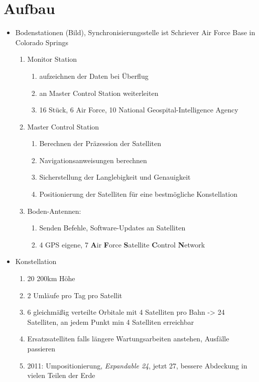 \section{Aufbau}
\label{sec:aufbau}

\begin{itemize}
    \item Bodenstationen (Bild), Synchronisierungsstelle ist Schriever Air Force Base in Colorado Springs
    \begin{enumerate}
        \item Monitor Station
        \begin{enumerate}
            \item aufzeichnen der Daten bei Überflug
            \item an Master Control Station weiterleiten
            \item 16 Stück, 6 Air Force, 10 National Geospital-Intelligence Agency
        \end{enumerate}
        \item Master Control Station
        \begin{enumerate}
            \item Berechnen der Präzession der Satelliten
            \item Navigationsanweisungen berechnen
            \item Sicherstellung der Langlebigkeit und Genauigkeit
            \item Positionierung der Satelliten für eine bestmögliche Konstellation
        \end{enumerate}
        \item Boden-Antennen:
        \begin{enumerate}
            \item Senden Befehle, Software-Updates an Satelliten
            \item 4 GPS eigene, 7 \textbf{A}ir \textbf{F}orce \textbf{S}atellite \textbf{C}ontrol \textbf{N}etwork
        \end{enumerate}
    \end{enumerate}
    \item Konstellation
    \begin{enumerate}
        \item 20 200km Höhe
        \item 2 Umläufe pro Tag pro Satellit
        \item 6 gleichmäßig verteilte Orbitale mit 4 Satelliten pro Bahn -> 24 Satelliten, an jedem Punkt min 4 Satelliten erreichbar
        \item Ersatzsatelliten falls längere Wartungsarbeiten anstehen, Ausfälle passieren
        \item 2011: Umpositionierung, \textit{Expandable 24}, jetzt 27, bessere Abdeckung in vielen Teilen der Erde
    \end{enumerate}
\end{itemize}
